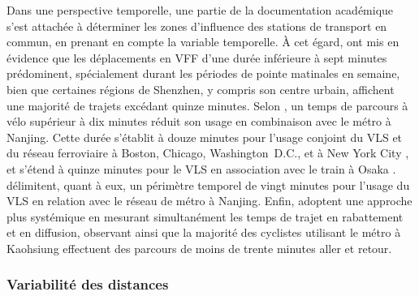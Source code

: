 \begin{refsegment}
Dans une perspective temporelle, une partie de la documentation académique s'est attachée à déterminer les zones d'influence des stations de transport en commun, en prenant en compte la variable temporelle. À cet égard, \textcolor{blue}{\textcite[18, 21]{li_factors_2020}} ont mis en évidence que les déplacements en \acrshort{VFF} d'une durée inférieure à sept minutes prédominent, spécialement durant les périodes de pointe matinales en semaine, bien que certaines régions de Shenzhen, y compris son centre urbain, affichent une majorité de trajets excédant quinze minutes. Selon \textcolor{blue}{\textcite[128]{liu_understanding_2020}}, un temps de parcours à vélo supérieur à dix minutes réduit son usage en combinaison avec le métro à Nanjing. Cette durée s'établit à douze minutes pour l'usage conjoint du \acrshort{VLS} et du réseau ferroviaire à Boston, Chicago, Washington~D.C., et à New York City \textcolor{blue}{\autocite[9]{kong_deciphering_2020}}, et s'étend à quinze minutes pour le \acrshort{VLS} en association avec le train à Osaka \textcolor{blue}{\autocite[3415]{tomita_demand_2017}}. \textcolor{blue}{\textcite[5]{yang_empirical_2016}} délimitent, quant à eux, un périmètre temporel de vingt minutes pour l'usage du \acrshort{VLS} en relation avec le réseau de métro à Nanjing. Enfin, \textcolor{blue}{\textcite[1696]{cheng_evaluating_2012}} adoptent une approche plus systémique en mesurant simultanément les temps de trajet en rabattement et en diffusion, observant ainsi que la majorité des cyclistes utilisant le métro à Kaohsiung effectuent des parcours de moins de trente minutes aller et retour.%

\subsubsection*{Variabilité des distances
    \label{chap2:variabilite-distances}
    }


\end{refsegment}
